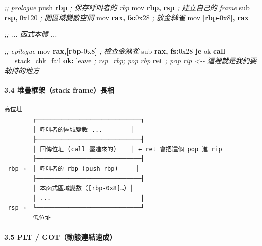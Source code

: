 \documentclass[10pt,a4paper]{article}
\newenvironment{Shaded}{\begin{snugshade}}{\end{snugshade}}
\newcommand{\BaseNTok}[1]{\textcolor[rgb]{0.00,0.00,0.81}{#1}}
\newcommand{\BuiltInTok}[1]{#1}
\newcommand{\CommentTok}[1]{\textcolor[rgb]{0.56,0.35,0.01}{\textit{#1}}}
\newcommand{\ControlFlowTok}[1]{\textcolor[rgb]{0.13,0.29,0.53}{\textbf{#1}}}
\newcommand{\FunctionTok}[1]{\textcolor[rgb]{0.13,0.29,0.53}{\textbf{#1}}}
\newcommand{\KeywordTok}[1]{\textcolor[rgb]{0.13,0.29,0.53}{\textbf{#1}}}
\newcommand{\NormalTok}[1]{#1}
\newcommand{\OperatorTok}[1]{\textcolor[rgb]{0.81,0.36,0.00}{\textbf{#1}}}
\renewenvironment{Shaded}{%
  \def\FrameCommand{\fboxsep=3.2pt\colorbox{shadecolor}}%
  \MakeFramed{\advance\hsize-\width\FrameRestore\small}%
}{%
  \endMakeFramed
}
\begin{document}
\begin{Shaded}
\begin{Highlighting}[]
\CommentTok{;; prologue}
\BuiltInTok{push} \KeywordTok{rbp}            \CommentTok{; 保存呼叫者的 rbp}
\BuiltInTok{mov}  \KeywordTok{rbp}\OperatorTok{,} \KeywordTok{rsp}       \CommentTok{; 建立自己的 frame}
\BuiltInTok{sub}  \KeywordTok{rsp}\OperatorTok{,} \BaseNTok{0x120}     \CommentTok{; 開區域變數空間}
\BuiltInTok{mov}  \KeywordTok{rax}\OperatorTok{,} \KeywordTok{fs}\OperatorTok{:}\BaseNTok{0x28}   \CommentTok{; 放金絲雀}
\BuiltInTok{mov}  \OperatorTok{[}\KeywordTok{rbp}\OperatorTok{{-}}\BaseNTok{0x8}\OperatorTok{],} \KeywordTok{rax}

\CommentTok{;; ... 函式本體 ...}

\CommentTok{;; epilogue}
\BuiltInTok{mov}  \KeywordTok{rax}\OperatorTok{,[}\KeywordTok{rbp}\OperatorTok{{-}}\BaseNTok{0x8}\OperatorTok{]}  \CommentTok{; 檢查金絲雀}
\BuiltInTok{sub}  \KeywordTok{rax}\OperatorTok{,} \KeywordTok{fs}\OperatorTok{:}\BaseNTok{0x28}
\ControlFlowTok{je}\NormalTok{   ok}
\ControlFlowTok{call}\NormalTok{ \_\_stack\_chk\_fail}
\FunctionTok{ok:} \BuiltInTok{leave}           \CommentTok{; rsp=rbp; pop rbp}
    \ControlFlowTok{ret}             \CommentTok{; pop rip  \textless{}{-}{-} 這裡就是我們要劫持的地方}
\end{Highlighting}
\end{Shaded}

\paragraph{3.4 堆疊框架（stack
frame）長相}\label{ux5806ux758aux6846ux67b6stack-frameux9577ux76f8}

\begin{Verbatim}[breaklines=true,breakanywhere=true,breakautoindent=false,fontsize=\fontsize{7.0}{9.5}\selectfont]
        高位址
        ┌─────────────────────────────┐
        │ 呼叫者的區域變數 ...        │
        ├─────────────────────────────┤
        │ 回傳位址 (call 壓進來的)    │ ← ret 會把這個 pop 進 rip
        ├─────────────────────────────┤
 rbp →  │ 呼叫者的 rbp (push rbp)     │
        ├─────────────────────────────┤
        │ 本函式區域變數（[rbp-0x8]…）│
        │ ...                         │
 rsp →  └─────────────────────────────┘
        低位址
\end{Verbatim}

\paragraph{3.5 PLT /
GOT（動態連結速成）}\label{plt-gotux52d5ux614bux9023ux7d50ux901fux6210}
\end{document}
